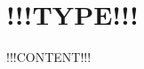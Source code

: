 \documentclass{article}
\begin{document}
\setlength{\parindent}{0pt}

\section*{!!!TYPE!!!}

!!!CONTENT!!!
\end{document}
